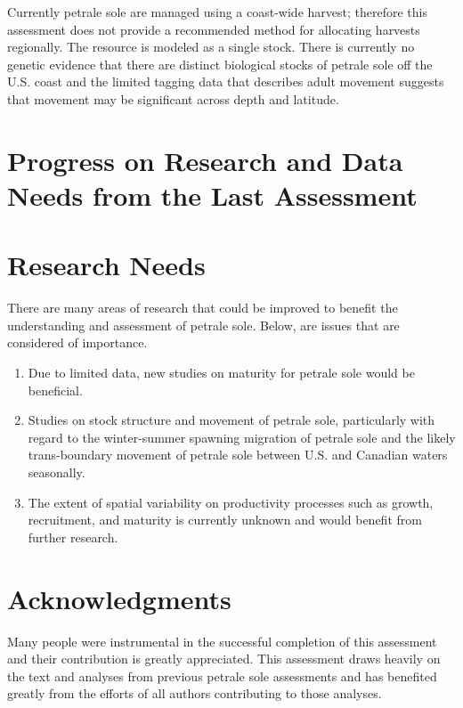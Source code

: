 \documentclass[12pt,]{article}
\begin{document}
Currently petrale sole are managed using a coast-wide harvest; therefore
this assessment does not provide a recommended method for allocating
harvests regionally. The resource is modeled as a single stock. There is
currently no genetic evidence that there are distinct biological stocks
of petrale sole off the U.S. coast and the limited tagging data that
describes adult movement suggests that movement may be significant
across depth and latitude.

\section{Progress on Research and Data Needs from the Last
Assessment}\label{progress-on-research-and-data-needs-from-the-last-assessment}

\section{Research Needs}\label{research-needs}

There are many areas of research that could be improved to benefit the
understanding and assessment of petrale sole. Below, are issues that are
considered of importance.

\begin{enumerate}

\item Due to limited data, new studies on maturity  for petrale sole would be beneficial.

\item Studies on stock structure and movement of petrale sole, particularly with regard to the winter-summer spawning migration of petrale sole and the likely trans-boundary movement of petrale sole between U.S. and Canadian waters seasonally.

\item The extent of spatial variability on productivity processes such as growth, recruitment, and maturity is currently unknown and would benefit from further research.

\end{enumerate}

\section{Acknowledgments}\label{acknowledgments}

Many people were instrumental in the successful completion of this
assessment and their contribution is greatly appreciated. This
assessment draws heavily on the text and analyses from previous petrale
sole assessments and has benefited greatly from the efforts of all
authors contributing to those analyses.
\end{document}
